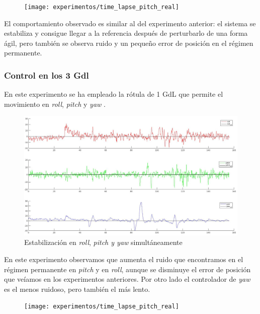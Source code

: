 \begin{figure}[htb!]
	\centering
	\texttt{[image: experimentos/time\_lapse\_pitch\_real]}
	\caption{}
	\label{tl_pr}	
\end{figure}

El comportamiento observado es similar al del experimento anterior: el sistema se estabiliza y consigue llegar a la referencia después de perturbarlo de una forma ágil, pero también se observa ruido y un pequeño error de posición en el régimen permanente.

\subsubsection{Control en los 3 Gdl}

En este experimento se ha empleado la rótula de 1 GdL que permite el movimiento en \textit{roll}, \textit{pitch} y \textit{yaw} .
\\

\begin{figure}[htb!]
	\centering
	\includegraphics[width=0.9\textheight,angle=90]{experimentos/3_in_one_matlab}
	\vspace{0.5cm}
	\caption{Estabilización en \textit{roll}, \textit{pitch y \textit{yaw}} simultáneamente}
	\label{tl_pr}	
\end{figure}
\newpage
En este experimento observamos que aumenta el ruido que encontramos en el régimen permanente en \textit{pitch} y en \textit{roll}, aunque se disminuye el error de posición que veíamos en los experimentos anteriores. Por otro lado el controlador de \textit{yaw} es el menos ruidoso, pero también el más lento.
\begin{figure}[htb!]
	\centering
	\texttt{[image: experimentos/time\_lapse\_pitch\_real]}
	\caption{}
	\label{mat_lab_graph}	
\end{figure}

%
